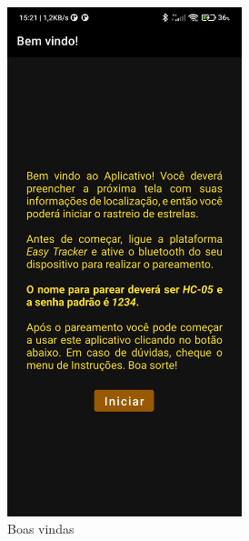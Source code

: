 \begin{figure}[H]
	\centering
	\caption{Telas Iniciais}
	\label{telasiniciais}
	\begin{subfigure}[b]{0.3\textwidth}
		\centering
		\includegraphics[width=0.75\textwidth]{figuras/desAplicativo/welcome}
		\caption{Boas vindas}
		\label{initial}
	\end{subfigure}
	\hfill
	\begin{subfigure}[b]{0.3\textwidth}
		\centering

\end{subfigure}
\end{figure}
